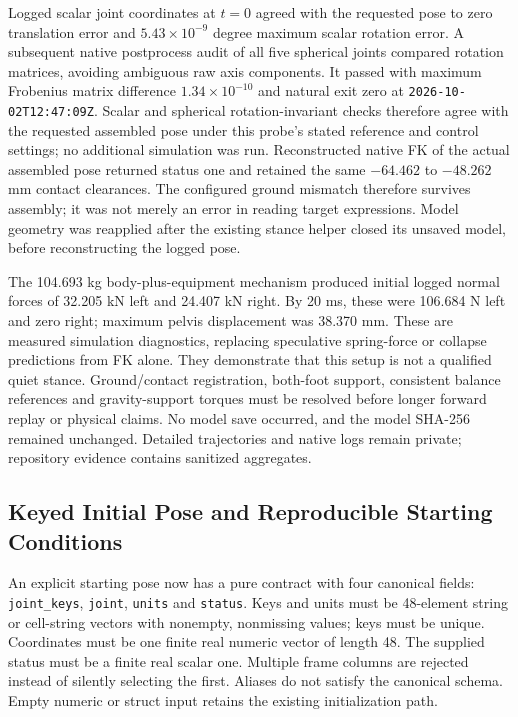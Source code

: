 \documentclass[11pt,a4paper]{article}
\begin{document}
Logged scalar joint coordinates at $t=0$ agreed with the requested pose to
zero translation error and $5.43\times10^{-9}$ degree maximum scalar
rotation error. A subsequent native postprocess audit of all five spherical joints compared
rotation matrices, avoiding ambiguous raw axis components. It passed with
maximum Frobenius matrix difference $1.34\times10^{-10}$ and natural exit
zero at \texttt{2026-10-02T12:47:09Z}. Scalar and spherical rotation-invariant
checks therefore agree with the requested assembled pose under this probe's
stated reference and control settings; no additional simulation was run. Reconstructed native
FK of the actual assembled pose returned status one and retained the same
$-64.462$ to $-48.262$ mm contact clearances. The configured ground mismatch
therefore survives assembly; it was not merely an error in reading target
expressions. Model geometry was reapplied after the existing stance helper
closed its unsaved model, before reconstructing the logged pose.

The 104.693 kg body-plus-equipment mechanism produced initial logged normal
forces of 32.205 kN left and 24.407 kN right. By 20 ms, these were 106.684 N
left and zero right; maximum pelvis displacement was 38.370 mm. These are
measured simulation diagnostics, replacing speculative spring-force or
collapse predictions from FK alone. They demonstrate that this setup is not
a qualified quiet stance. Ground/contact registration, both-foot support,
consistent balance references and gravity-support torques must be resolved
before longer forward replay or physical claims. No model save occurred,
and the model SHA-256 remained unchanged. Detailed trajectories and native
logs remain private; repository evidence contains sanitized aggregates.


\subsection{Keyed Initial Pose and Reproducible Starting Conditions}
An explicit starting pose now has a pure contract with four canonical fields:
\texttt{joint\_keys}, \texttt{joint}, \texttt{units} and \texttt{status}.
Keys and units must be 48-element string or cell-string vectors with nonempty,
nonmissing values; keys must be unique. Coordinates must be one finite real
numeric vector of length 48. The supplied status must be a finite real scalar
one. Multiple frame columns are rejected instead of silently selecting the
first. Aliases do not satisfy the canonical schema. Empty numeric or struct
input retains the existing initialization path.
\end{document}
